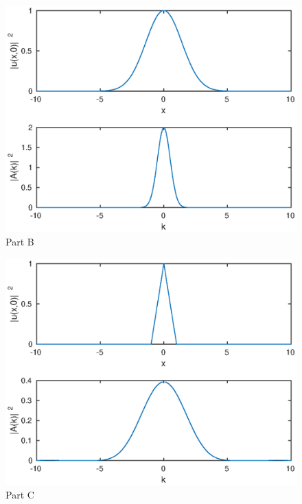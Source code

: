 \documentclass[a4paper,11pt]{article}
\numberwithin{equation}{section}
\begin{document}
\begin{figure}[p]
 \caption{Part B}
 \centering
   \includegraphics[width=\textwidth]{b}
\end{figure}

\begin{figure}[p]
 \caption{Part C}
 \centering
   \includegraphics[width=\textwidth]{c}
\end{figure}
\end{document}
